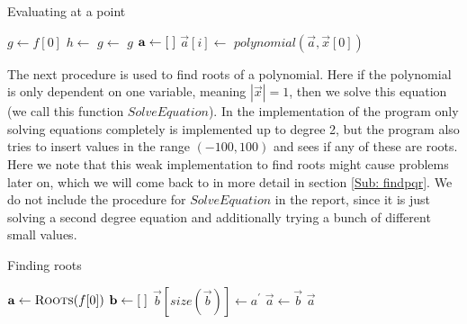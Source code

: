 \begin{algorithm}[H]
  \caption{Evaluating at a point}
  \begin{algorithmic}[1]
        \State $g\gets f[0]$
          \State $h\gets$ 
          \State $g\gets$ 
        \EndFor
        \State \Return $g$
      \Else
        \State $\mathbf{a}\gets[\hspace*{1mm}]$
          \State $\vec{a}[i]\gets$ 
        \EndFor
        \State \Return $polynomial(\vec{a},\vec{x}[0])$
      \EndIf
    \EndProcedure
  \end{algorithmic}
\end{algorithm}

The next procedure is used to find roots of a polynomial. Here if the polynomial is only dependent on one variable, meaning $|\vec{x}|=1$, then we solve this equation (we call this function $SolveEquation$). In the implementation of the program only solving equations completely is implemented up to degree 2, but the program also tries to insert values in the range $(-100,100)$ and sees if any of these are roots. Here we note that this weak implementation to find roots might cause problems later on, which we will come back to in more detail in section \ref{Sub: findpqr}. We do not include the procedure for $SolveEquation$ in the report, since it is just solving a second degree equation and additionally trying a bunch of different small values.
\begin{algorithm}[H]
  \caption{Finding roots}
  \label{Alg: Roots}
  \begin{algorithmic}[1]
        \State \Return {}
      \Else
        \State $\vec{a}\gets \Call{Roots}{f[0]}$
          \State $\mathbf{b}\gets [\hspace*{1mm}]$
              \State $\vec{b}[size(\vec{b})]\gets a^\prime$
            \EndIf
          \EndFor
          \State $\vec{a}\gets \vec{b}$
        \EndFor
        \State \Return $\vec{a}$
      \EndIf
    \EndProcedure
  \end{algorithmic}
\end{algorithm}

